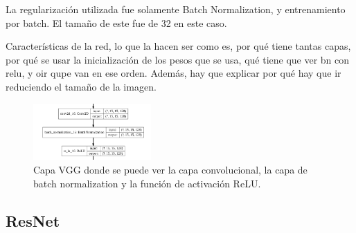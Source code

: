         La regularización utilizada fue solamente Batch Normalization, y entrenamiento por batch. El tamaño de este fue de 32 en este caso.
        
        Características de la red, lo que la hacen ser como es, por qué tiene tantas capas, por qué se usar la inicialización de los pesos que se usa, qué tiene que ver bn con relu, y oir qupe van en ese orden. Además, hay que explicar por qué hay que ir reduciendo el tamaño de la imagen.
        
        \begin{figure}[t]
            \centering
            \includegraphics[width=0.4\textwidth]{img/vgg_layer.png}
            \caption{Capa VGG donde se puede ver la capa convolucional, la capa de batch normalization y la función de activación ReLU.}
            \label{fig:vgg_layer}
        \end{figure}
    
    \subsection{ResNet}
    
